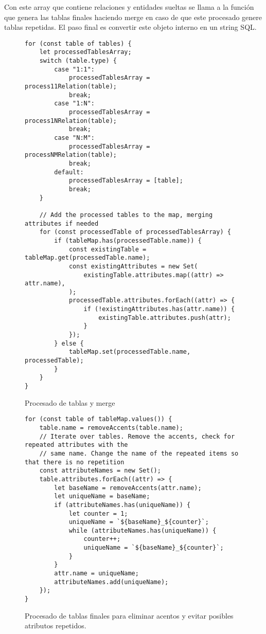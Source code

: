 Con este array que contiene relaciones y entidades sueltas se llama a la función que genera las tablas finales haciendo merge en caso de que  este procesado genere tablas repetidas.
El paso final es convertir este objeto interno en un string SQL.

\begin{figure}[h]
\lstset{breaklines=true, basicstyle=\footnotesize}
\begin{lstlisting}[frame=single]
for (const table of tables) {
    let processedTablesArray;
    switch (table.type) {
        case "1:1":
            processedTablesArray = process11Relation(table);
            break;
        case "1:N":
            processedTablesArray = process1NRelation(table);
            break;
        case "N:M":
            processedTablesArray = processNMRelation(table);
            break;
        default:
            processedTablesArray = [table];
            break;
    }

    // Add the processed tables to the map, merging attributes if needed
    for (const processedTable of processedTablesArray) {
        if (tableMap.has(processedTable.name)) {
            const existingTable = tableMap.get(processedTable.name);
            const existingAttributes = new Set(
                existingTable.attributes.map((attr) => attr.name),
            );
            processedTable.attributes.forEach((attr) => {
                if (!existingAttributes.has(attr.name)) {
                    existingTable.attributes.push(attr);
                }
            });
        } else {
            tableMap.set(processedTable.name, processedTable);
        }
    }
}
\end{lstlisting}
\caption{Procesado de tablas y merge}
\end{figure}
\clearpage

\begin{figure}[h]
\lstset{breaklines=true, basicstyle=\footnotesize}
\begin{lstlisting}[frame=single]
for (const table of tableMap.values()) {
    table.name = removeAccents(table.name);
    // Iterate over tables. Remove the accents, check for repeated attributes with the
    // same name. Change the name of the repeated items so that there is no repetition
    const attributeNames = new Set();
    table.attributes.forEach((attr) => {
        let baseName = removeAccents(attr.name);
        let uniqueName = baseName;
        if (attributeNames.has(uniqueName)) {
            let counter = 1;
            uniqueName = `${baseName}_${counter}`;
            while (attributeNames.has(uniqueName)) {
                counter++;
                uniqueName = `${baseName}_${counter}`;
            }
        }
        attr.name = uniqueName;
        attributeNames.add(uniqueName);
    });
}
\end{lstlisting}
\caption{Procesado de tablas finales para eliminar acentos y evitar posibles atributos repetidos.}
\end{figure}

